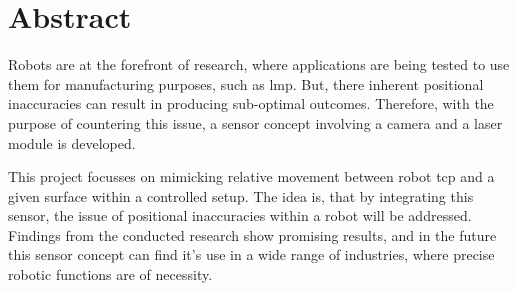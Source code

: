 \chapter*{Abstract}


Robots are at the forefront of research, where applications are being tested to use them for manufacturing purposes, such as \gls{lmp}. But, there inherent positional inaccuracies can result in producing sub-optimal outcomes. Therefore, with the purpose of countering this issue, a sensor concept involving a camera and a laser module is developed. 

\vspace{5mm}
\noindent This project focusses on mimicking relative movement between robot \gls{tcp} and a given surface within a controlled setup. The idea is, that by integrating this sensor, the issue of positional inaccuracies within a robot will be addressed. Findings from the conducted research show promising results, and in the future this sensor concept can find it's use in a wide range of industries, where precise robotic functions are of necessity.